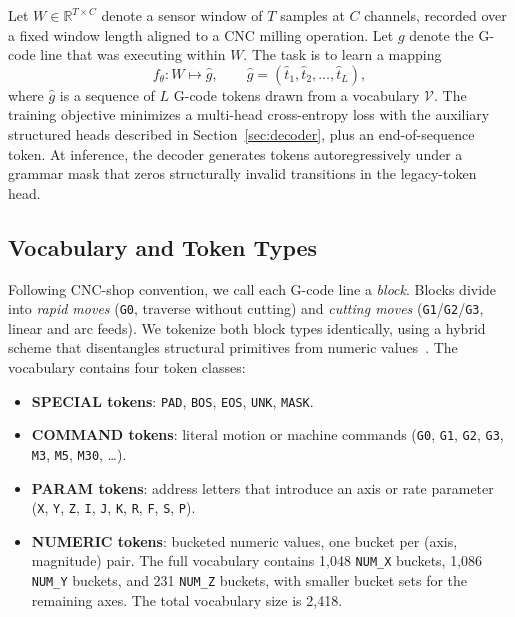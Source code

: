 \documentclass[sensors,article,submit,moreauthors,pdftex]{Definitions/mdpi}
\begin{document}
Let $W \in \mathbb{R}^{T \times C}$ denote a sensor window of $T$ samples at $C$ channels, recorded over a fixed window length aligned to a CNC milling operation. Let $g$ denote the G-code line that was executing within $W$. The task is to learn a mapping
\begin{equation*}
  f_\theta: W \mapsto \hat{g}, \qquad \hat{g} = (\hat{t}_1, \hat{t}_2, \dots, \hat{t}_L),
\end{equation*}
where $\hat{g}$ is a sequence of $L$ G-code tokens drawn from a vocabulary $\mathcal{V}$. The training objective minimizes a multi-head cross-entropy loss with the auxiliary structured heads described in Section~\ref{sec:decoder}, plus an end-of-sequence token. At inference, the decoder generates tokens autoregressively under a grammar mask that zeros structurally invalid transitions in the legacy-token head.

\subsection{Vocabulary and Token Types}
\label{sec:problem-vocab}

Following CNC-shop convention, we call each G-code line a \emph{block}. Blocks divide into \emph{rapid moves} (\texttt{G0}, traverse without cutting) and \emph{cutting moves} (\texttt{G1}/\texttt{G2}/\texttt{G3}, linear and arc feeds). We tokenize both block types identically, using a hybrid scheme that disentangles structural primitives from numeric values~\cite{grammar_paper,gcode_foundational}. The vocabulary contains four token classes:
\begin{itemize}
\item \textbf{SPECIAL tokens}: \texttt{PAD}, \texttt{BOS}, \texttt{EOS}, \texttt{UNK}, \texttt{MASK}.
\item \textbf{COMMAND tokens}: literal motion or machine commands (\texttt{G0}, \texttt{G1}, \texttt{G2}, \texttt{G3}, \texttt{M3}, \texttt{M5}, \texttt{M30}, \ldots).
\item \textbf{PARAM tokens}: address letters that introduce an axis or rate parameter (\texttt{X}, \texttt{Y}, \texttt{Z}, \texttt{I}, \texttt{J}, \texttt{K}, \texttt{R}, \texttt{F}, \texttt{S}, \texttt{P}).
\item \textbf{NUMERIC tokens}: bucketed numeric values, one bucket per (axis, magnitude) pair. The full vocabulary contains 1{,}048 \texttt{NUM\_X} buckets, 1{,}086 \texttt{NUM\_Y} buckets, and 231 \texttt{NUM\_Z} buckets, with smaller bucket sets for the remaining axes. The total vocabulary size is 2{,}418.
\end{itemize}
\end{document}
